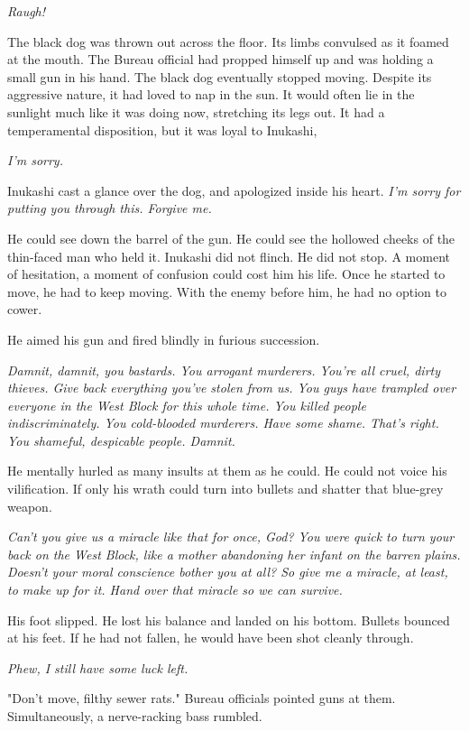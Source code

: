 \mybreak

\emph{Raugh!}

The black dog was thrown out across the floor. Its limbs convulsed as it
foamed at the mouth. The Bureau official had propped himself up and was
holding a small gun in his hand. The black dog eventually stopped
moving. Despite its aggressive nature, it had loved to nap in the sun.
It would often lie in the sunlight much like it was doing now,
stretching its legs out. It had a temperamental disposition, but it was
loyal to Inukashi,

\emph{I'm sorry.}

Inukashi cast a glance over the dog, and apologized inside his heart.
\emph{I'm sorry for putting you through this. Forgive me.}

He could see down the barrel of the gun. He could see the hollowed
cheeks of the thin-faced man who held it. Inukashi did not flinch. He
did not stop. A moment of hesitation, a moment of confusion could cost
him his life. Once he started to move, he had to keep moving. With the
enemy before him, he had no option to cower.

He aimed his gun and fired blindly in furious succession.

\emph{Damnit, damnit, you bastards. You arrogant murderers. You're all cruel,
dirty thieves. Give back everything you've stolen from us. You guys have
trampled over everyone in the West Block for this whole time. You killed
people indiscriminately. You cold-blooded murderers. Have some shame.
That's right. You shameful, despicable people. Damnit.}

He mentally hurled as many insults at them as he could. He could not
voice his vilification. If only his wrath could turn into bullets and
shatter that blue-grey weapon.

\emph{Can't you give us a miracle like that for once, God? You were quick to
turn your back on the West Block, like a mother abandoning her infant on
the barren plains. Doesn't your moral conscience bother you at all? So
give me a miracle, at least, to make up for it. Hand over that miracle
so we can survive.}

His foot slipped. He lost his balance and landed on his bottom. Bullets
bounced at his feet. If he had not fallen, he would have been shot
cleanly through.

\emph{Phew, I still have some luck left.}

"Don't move, filthy sewer rats." Bureau officials pointed guns at them.
Simultaneously, a nerve-racking bass rumbled.

